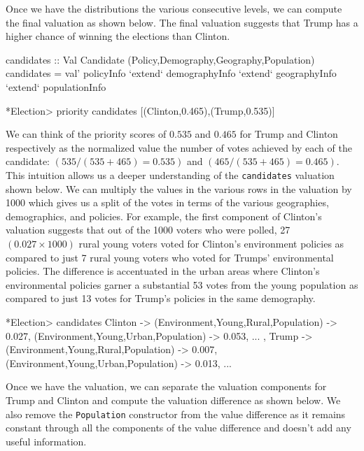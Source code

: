 \documentclass{jfp}
\newcommand{\prog}[1]{\texttt{#1}}
\begin{document}
Once we have the distributions the various consecutive levels, we can compute the final valuation as shown below. The final valuation suggests that Trump has a higher chance of winning the elections than Clinton. 
\begin{haskellcode}
candidates :: Val Candidate (Policy,Demography,Geography,Population)
candidates = val' policyInfo `extend` demographyInfo `extend` geographyInfo 
             `extend` populationInfo

*Election> priority candidates
[(Clinton,0.465),(Trump,0.535)]
\end{haskellcode}

We can think of the priority scores of $0.535$ and $0.465$ for Trump and Clinton respectively as the normalized value the number of votes achieved by each of the candidate: $(535/(535 + 465) = 0.535)$ and $(465/(535 + 465) = 0.465)$. This intuition allows us a deeper understanding of the \prog{candidates} valuation shown below. We can multiply the values in the various rows in the valuation by 1000 which gives us a split of the votes in terms of the various geographies, demographics, and policies. For example, the first component of Clinton's valuation suggests that out of the 1000 voters who were polled, 27 $(0.027 \times 1000)$ rural young voters voted for Clinton's environment policies as compared to just 7 rural young voters who voted for Trumps' environmental policies. The difference is accentuated in the urban areas where Clinton's environmental policies garner a substantial 53 votes from the young population as compared to just 13 votes for Trump's policies in the same demography. 
\begin{haskellcode}
*Election> candidates
{Clinton -> {(Environment,Young,Rural,Population) -> 0.027,
             (Environment,Young,Urban,Population) -> 0.053,
                          ...
            },
 Trump -> {(Environment,Young,Rural,Population) -> 0.007,
           (Environment,Young,Urban,Population) -> 0.013,
                       ...
          }}
\end{haskellcode}

Once we have the valuation, we can separate the valuation components for Trump and Clinton and compute the valuation difference as shown below. We also remove the \prog{Population} constructor from the value difference as it remains constant through all the components of the value difference and doesn't add any useful information.
\end{document}

